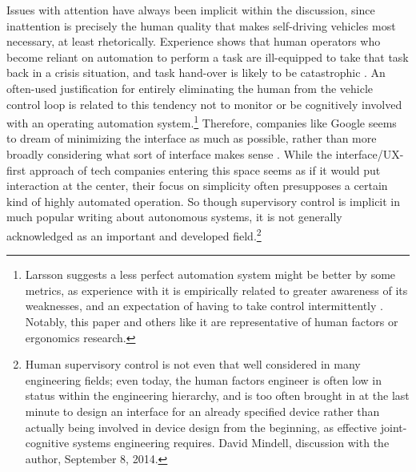 Issues with attention have always been implicit within the discussion,
since inattention is precisely the human quality that makes
self-driving vehicles most necessary, at least rhetorically. %
Experience shows that human operators who become reliant on
automation to perform a task are ill-equipped to take that task back
in a crisis situation, and task hand-over is likely to be
catastrophic \cite{AF447} \cite{Chowpaper}. An often-used justification
for entirely eliminating the human from the vehicle control loop is
related to this tendency not to monitor or be cognitively involved
with an operating automation system.\footnote{Larsson suggests a less perfect
  automation system might be better 
  by some metrics, as experience with it is empirically related to
  greater awareness of its weaknesses, and an expectation of having to
take control intermittently \cite{larsson}. Notably, this paper and
others like it are representative of human factors or ergonomics
research.} Therefore, companies like Google seems to dream
of minimizing the interface as much as possible, rather than more
broadly considering what sort of interface makes sense \cite{markoffNext}.
While the interface/UX-first approach of tech companies entering this
space seems as if it
would put interaction at the center, their focus on simplicity often
presupposes a certain kind of highly automated operation.
So though supervisory control is
implicit in much popular writing about autonomous systems,
it is not generally acknowledged as an important and
developed field.\footnote{Human supervisory control is not even that well
considered in many engineering fields; even today, the human factors
engineer is often low in status within the engineering hierarchy, and
is too often brought in at the last minute to design an interface for
an already specified device rather than actually
being involved in 
device design from the beginning, as effective joint-cognitive systems
engineering
requires. David Mindell,
  discussion with the author, September 8, 2014.} %



